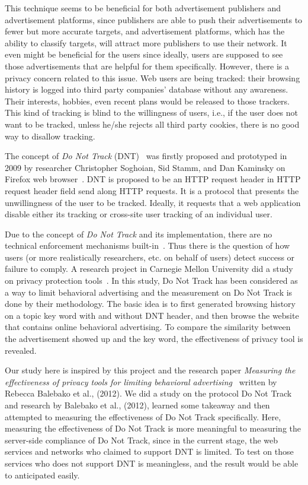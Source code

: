 \documentclass{sig-alternate}
\begin{document}
This technique seems to be beneficial for both advertisement publishers and advertisement platforms, since publishers are able to push their advertisements to fewer but more accurate targets, and advertisement platforms, which has the ability to classify targets, will attract more publishers to use their network. It even might be beneficial for the users since ideally, users are supposed to see those advertisements that are helpful for them specifically. However, there is a privacy concern related to this issue. Web users are being tracked: their browsing history is logged into third party companies' database without any awareness. Their interests, hobbies, even recent plans would be released to those trackers. This kind of tracking is blind to the willingness of users, i.e., if the user does not want to be tracked, unless he/she rejects all third party cookies, there is no good way to disallow tracking.

The concept of \emph{Do Not Track} (DNT)~\cite{tschofenignot} was firstly proposed and prototyped in 2009 by researcher Christopher Soghoian, Sid Stamm, and Dan Kaminsky on Firefox web browser~\cite{wikidnt}. DNT is proposed to be an HTTP request header in HTTP request header field send along HTTP requests. It is a protocol that presents the unwillingness of the user to be tracked. Ideally, it requests that a web application disable either its tracking or cross-site user tracking of an individual user.

Due to the concept of \emph{Do Not Track} and its implementation, there are no technical enforcement mechanisms built-in~\cite{tschofenignot}. Thus there is the question of how users (or more realistically researchers, etc. on behalf of users) detect success or failure to comply. A research project in Carnegie Mellon University did a study on privacy protection tools~\cite{balebako2012measuring}. In this study, Do Not Track has been considered as a way to limit behavioral advertising and the measurement on Do Not Track is done by their methodology. The basic idea is to first generated browsing history on a topic key word with and without DNT header, and then browse the website that contains online behavioral advertising. To compare the similarity between the advertisement showed up and the key word, the effectiveness of privacy tool is revealed.

Our study here is inspired by this project and the research paper \emph{Measuring the effectiveness of privacy tools for limiting behavioral advertising}~\cite{balebako2012measuring} written by Rebecca Balebako et al., (2012). We did a study on the protocol Do Not Track and research by Balebako et al., (2012), learned some takeaway and then attempted to measuring the effectiveness of Do Not Track specifically. Here, measuring the effectiveness of Do Not Track is more meaningful to measuring the server-side compliance of Do Not Track, since in the current stage, the web services and networks who claimed to support DNT is limited. To test on those services who does not support DNT is meaningless, and the result would be able to anticipated easily.
\end{document}
